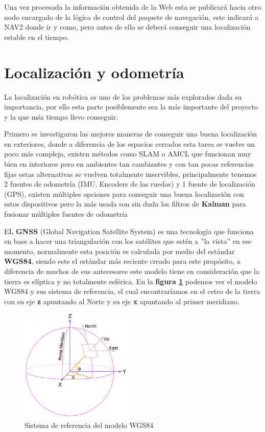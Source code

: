 Una vez procesada la información obtenida de la Web esta se publicará hacia otro nodo encargado de la lógica de control del paquete de 
navegación, este indicará a NAV2 donde ir y como, pero antes de ello se deberá conseguir una localización estable en el tiempo.

\section{Localización y odometría}

La localización en robótica es uno de los problemas más explorados dada su importancia, por ello esta parte posiblemente sea la más 
importante del proyecto y la que mśa tiempo llevo conseguir.

Primero se investigaron las mejores maneras de conseguir una buena localización en exteriores, donde a diferencia de los espacios cerrados 
esta tarea se vuelve un poco más compleja, existen métodos como SLAM o AMCL que funcionan muy bien en interiores pero en 
ambientes tan cambiantes y con tan pocas referencias fijas estas alternativas se vuelven totalmente 
inservibles, principalmente tenemos 2 fuentes de odometría (IMU, Encoders de las ruedas) y 1 fuente de localización (GPS), existen múltiples 
opciones para conseguir una buena localización con estos dispositivos 
pero la más usada son sin duda los filtros de \textbf{Kalman} para fusionar múltiples fuentes de odometría 
 
EL \textbf{GNSS} (Global Navigation Satellite System) es una tecnología que funciona en base a hacer una triangulación con los satélites que 
estén a ''la vista'' en ese momento, normalmente esta 
posición es calculada por medio del estándar \textbf{WGS84}, siendo este el estándar más reciente creado para este propósito, a 
diferencia de muchos de sus antecesores este modelo tiene en consideración 
que la tierra es elíptica y no totalmente esférica. En la \textbf{figura \ref{fig:wgs84}} podemos ver el modelo WGS84 y sus sistema 
de referencia, el cual encontraríamos en el cetro de la tierra 
con su eje \textbf{z} apuntando al Norte y su eje \textbf{x} apuntando al primer meridiano.

\begin{figure}[h]
    \centering
    \includegraphics[width=0.5\textwidth]{images/wgs84.png}
    \caption{Sistema de referencia del modelo WGS84}
    \label{fig:wgs84}
\end{figure}

